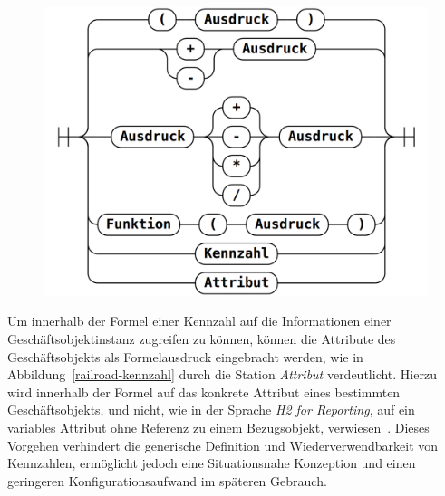 \documentclass[
  language=german, %
  type=bachelor%
]{isthesis}
\begin{document}
\begin{content}
  \begin{figure}[caption={Ausdruck Syntaxdiagramm}, label={railroad-kennzahl}]
    \includegraphics[scale=0.25]{content/figures/railroad-kennzahl.png}
  \end{figure}

  Um innerhalb der Formel einer Kennzahl auf die Informationen einer
  Geschäftsobjektinstanz zugreifen zu können, können die Attribute des
  Geschäftsobjekts als Formelausdruck eingebracht werden, wie in
  Abbildung~\ref{railroad-kennzahl} durch die Station \textit{Attribut} verdeutlicht. Hierzu
  wird innerhalb der Formel auf das konkrete Attribut eines bestimmten
  Geschäftsobjekts, und nicht, wie in der Sprache \textit{H2 for Reporting},
  auf ein variables Attribut ohne Referenz zu einem Bezugsobjekt,
  verwiesen~\cite[][S.  20]{becker2007h2}. Dieses Vorgehen verhindert die
  generische Definition und Wiederverwendbarkeit von Kennzahlen, ermöglicht
  jedoch eine Situationsnahe Konzeption und einen geringeren
  Konfigurationsaufwand im späteren Gebrauch.


\end{content}
\end{document}
